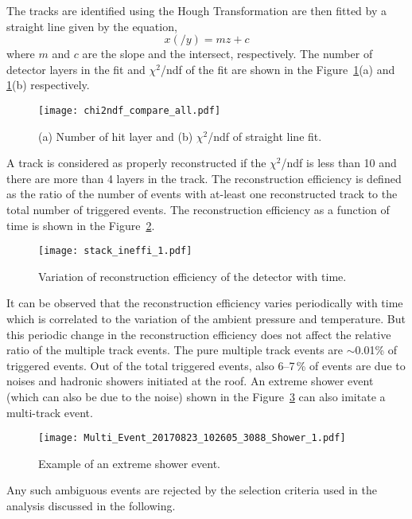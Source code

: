 The tracks are identified using the Hough Transformation are then
fitted by a straight line given by the equation,
\begin{equation}
  x\left(/y\right)=mz+c \label{eq:plain}
\end{equation}
where $m$ and $c$ are the slope and the intersect, respectively.
The number of detector layers in the fit and $\chi^{2}$/ndf of
the fit are shown in the Figure~\ref{fig:chi2ndf}(a) and
\ref{fig:chi2ndf}(b) respectively.
\begin{figure}[h]
  \texttt{[image: chi2ndf\_compare\_all.pdf]} 
  \caption{(a) Number of hit layer and
    (b) $\chi^2$/ndf of straight line fit.}
  \label{fig:chi2ndf}
\end{figure}
A track is considered as properly reconstructed if the $\chi^{2}$/ndf
is less than 10 and there are more than 4 layers in the track.
The reconstruction efficiency is defined as the ratio of the number
of events with at-least one reconstructed track to the total number
of triggered events. The reconstruction efficiency as a function of 
time is shown in the Figure~\ref{fig:stackineffi}.
\begin{figure}[h]
  \texttt{[image: stack\_ineffi\_1.pdf]} 
  \caption{Variation of reconstruction efficiency of the detector
    with time.}
  \label{fig:stackineffi}
\end{figure}
It can be observed that the reconstruction efficiency varies
periodically with time which is correlated to the variation
of the ambient pressure and temperature. But this periodic change in 
the reconstruction efficiency does not affect the relative ratio of
the multiple track events. The pure multiple track events are
$\sim$0.01\% of triggered events. Out of the total triggered events,
also 6--7\,\% of events are due to noises and hadronic showers
initiated at the roof.
An extreme shower event (which can also be due to the noise) shown
in the Figure~\ref{fig:eshower} can also imitate a multi-track event.
\begin{figure}[h]
\texttt{[image: Multi\_Event\_20170823\_102605\_3088\_Shower\_1.pdf]} 
 \caption{Example of an extreme shower event.}
 \label{fig:eshower}
\end{figure}
Any such ambiguous events are rejected by the selection criteria
used in the analysis discussed in the following.

